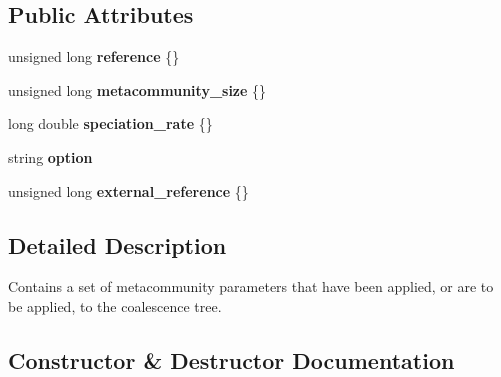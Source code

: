 \subsection*{Public Attributes}
\begin{DoxyCompactItemize}
\item 
unsigned long {\bfseries reference} \{\}\hypertarget{struct_metacommunity_parameters_af6c04331c114ae95467ff2301789a67b}{}\label{struct_metacommunity_parameters_af6c04331c114ae95467ff2301789a67b}

\item 
unsigned long {\bfseries metacommunity\+\_\+size} \{\}\hypertarget{struct_metacommunity_parameters_a92d44abb439daab624572ed7f9199ab4}{}\label{struct_metacommunity_parameters_a92d44abb439daab624572ed7f9199ab4}

\item 
long double {\bfseries speciation\+\_\+rate} \{\}\hypertarget{struct_metacommunity_parameters_a6ad494c076296c0eac963facca209430}{}\label{struct_metacommunity_parameters_a6ad494c076296c0eac963facca209430}

\item 
string {\bfseries option}\hypertarget{struct_metacommunity_parameters_a26315e37aafdc4031bb3ba10d3a1c30c}{}\label{struct_metacommunity_parameters_a26315e37aafdc4031bb3ba10d3a1c30c}

\item 
unsigned long {\bfseries external\+\_\+reference} \{\}\hypertarget{struct_metacommunity_parameters_a921f76a25b723959f7b019ac80afc670}{}\label{struct_metacommunity_parameters_a921f76a25b723959f7b019ac80afc670}

\end{DoxyCompactItemize}


\subsection{Detailed Description}
Contains a set of metacommunity parameters that have been applied, or are to be applied, to the coalescence tree. 

\subsection{Constructor \& Destructor Documentation}
